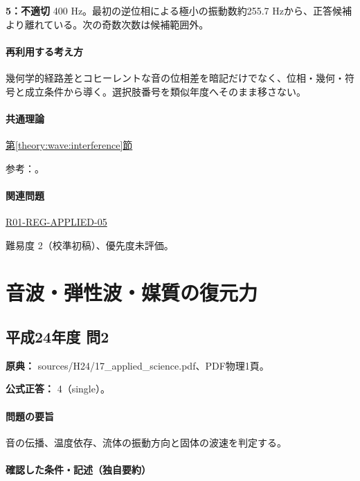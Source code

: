 \noindent\textbf{5：不適切} 400 Hz。最初の逆位相による極小の振動数約255.7 Hzから、正答候補より離れている。次の奇数次数は候補範囲外。\par

\paragraph{再利用する考え方} 幾何学的経路差とコヒーレントな音の位相差を暗記だけでなく、位相・幾何・符号と成立条件から導く。選択肢番号を類似年度へそのまま移さない。

\paragraph{共通理論} \hyperref[theory:wave:interference]{第\ref*{theory:wave:interference}節}

\par 参考：\cite{os_superposition}。

\paragraph{関連問題} \hyperref[q:r01-reg-applied-05]{R01-REG-APPLIED-05}

\par 難易度 2（校準初稿）、優先度未評価。

\section{音波・弾性波・媒質の復元力}

\subsection{平成24年度 問2}
\label{q:h24-reg-applied-02}

\noindent\textbf{原典：} sources/H24/17\_applied\_science.pdf、PDF物理1頁。

\textbf{公式正答：} 4（single）。

\paragraph{問題の要旨} 音の伝播、温度依存、流体の振動方向と固体の波速を判定する。

\paragraph{確認した条件・記述（独自要約）}\mbox{}\par

